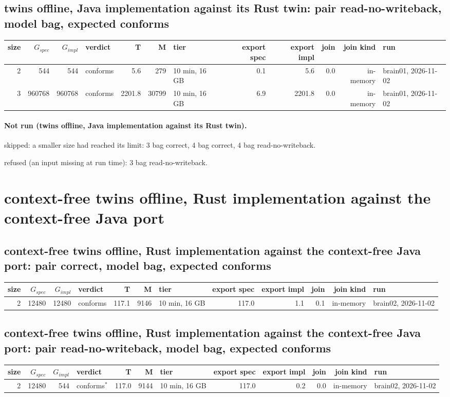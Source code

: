 \documentclass[10pt]{article}
\begin{document}
\subsection*{twins offline, Java implementation against its Rust twin: pair \textsf{read-no-writeback}, model bag, expected conforms}
\begin{longtable}{@{}rrrlrrlrrrrl@{}}
\toprule
size & $G_{\mathit{spec}}$ & $G_{\mathit{impl}}$ & verdict & T & M & tier & export spec & export impl & join & join kind & run \\
\midrule
\endhead
\color{red} 2 & 544 & 544 & conforms & 5.6 & 279 & 10 min, 16 GB & 0.1 & 5.6 & 0.0 & in-memory & brain01, 2026-11-02 \\
\color{red} 3 & 960768 & 960768 & conforms & 2201.8 & 30799 & 10 min, 16 GB & 6.9 & 2201.8 & 0.0 & in-memory & brain01, 2026-11-02 \\
\bottomrule
\end{longtable}
\paragraph{Not run (twins offline, Java implementation against its Rust twin).}
skipped: a smaller size had reached its limit: 3 bag correct, 4 bag correct, 4 bag read-no-writeback.\par
refused (an input missing at run time): 3 bag read-no-writeback.\par
\section*{context-free twins offline, Rust implementation against the context-free Java port}
\subsection*{context-free twins offline, Rust implementation against the context-free Java port: pair \textsf{correct}, model bag, expected conforms}
\begin{longtable}{@{}rrrlrrlrrrrl@{}}
\toprule
size & $G_{\mathit{spec}}$ & $G_{\mathit{impl}}$ & verdict & T & M & tier & export spec & export impl & join & join kind & run \\
\midrule
\endhead
\color{red} 2 & 12480 & 12480 & conforms & 117.1 & 9146 & 10 min, 16 GB & 117.0 & 1.1 & 0.1 & in-memory & brain02, 2026-11-02 \\
\bottomrule
\end{longtable}
\subsection*{context-free twins offline, Rust implementation against the context-free Java port: pair \textsf{read-no-writeback}, model bag, expected conforms}
\begin{longtable}{@{}rrrlrrlrrrrl@{}}
\toprule
size & $G_{\mathit{spec}}$ & $G_{\mathit{impl}}$ & verdict & T & M & tier & export spec & export impl & join & join kind & run \\
\midrule
\endhead
\color{red} 2 & 12480 & 544 & conforms$^{\ast}$ & 117.0 & 9144 & 10 min, 16 GB & 117.0 & 0.2 & 0.0 & in-memory & brain02, 2026-11-02 \\
\bottomrule
\end{longtable}
\end{document}
